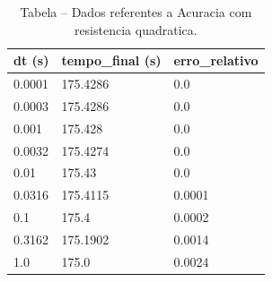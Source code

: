 \begin{table}[H]
\centering
\caption{Tabela – Dados referentes a Acuracia com resistencia quadratica.}
\label{tab:acuracia_com_resistencia_quadratica}
\begin{tabular}{lll}
\toprule
dt (s) & tempo\_final (s) & erro\_relativo \\
\midrule
0.0001 & 175.4286 & 0.0 \\
0.0003 & 175.4286 & 0.0 \\
0.001 & 175.428 & 0.0 \\
0.0032 & 175.4274 & 0.0 \\
0.01 & 175.43 & 0.0 \\
0.0316 & 175.4115 & 0.0001 \\
0.1 & 175.4 & 0.0002 \\
0.3162 & 175.1902 & 0.0014 \\
1.0 & 175.0 & 0.0024 \\
\bottomrule
\end{tabular}

\end{table}
